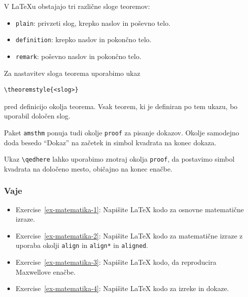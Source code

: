 \begin{example}\label{eg_theorems_1}\end{example}V LaTeXu obstajajo tri različne sloge teoremov:

\begin{itemize}
\item \texttt{plain}: privzeti slog, krepko naslov in poševno telo.
\item \texttt{definition}: krepko naslov in pokončno telo.
\item \texttt{remark}: poševno naslov in pokončno telo.
\end{itemize}

Za nastavitev sloga teorema uporabimo ukaz

\begin{verbatim}
\theoremstyle{<slog>}
\end{verbatim}

pred definicijo okolja teorema.
Vsak teorem, ki je definiran po tem ukazu, bo uporabil določen slog.

\begin{example}\label{eg_theorems_2}\end{example}Paket \texttt{amsthm} ponuja tudi okolje \texttt{proof} za pisanje dokazov.
Okolje samodejno doda besedo ``Dokaz'' na začetek in simbol kvadrata na konec dokaza.

\begin{example}\label{eg-theorems_3}\end{example}Ukaz \texttt{{\textbackslash}qedhere} lahko uporabimo znotraj okolja \texttt{proof}, da postavimo simbol kvadrata na določeno mesto, običajno na konec enačbe.

\begin{example}\label{eg-theorems_4}\end{example}\subsubsection{Vaje}\label{latexMatematika_vaje}

\begin{itemize}
\item Exercise~\ref{ex-matematika-1}: Napišite LaTeX kodo za osnovne matematične izraze.
\item Exercise~\ref{ex-matematika-2}: Napišite LaTeX kodo za matematične izraze z uporaba okolji \texttt{align} in \texttt{align*} in \texttt{aligned}.
\item Exercise~\ref{ex-matematika-3}: Napišite LaTeX kodo, da reproducira Maxwellove enačbe.
\item Exercise~\ref{ex-matematika-4}: Napišite LaTeX kodo za izreke in dokaze.
\end{itemize}